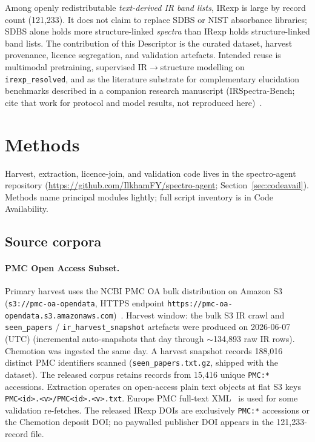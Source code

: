 \documentclass[pdflatex,sn-nature]{sn-jnl}
\begin{document}
Among openly redistributable \emph{text-derived IR band lists}, IRexp is large by
record count (121,233).
It does not claim to replace SDBS or NIST absorbance libraries; SDBS alone holds
more structure-linked \emph{spectra} than IRexp holds structure-linked band lists.
The contribution of this Descriptor is the curated dataset, harvest provenance,
licence segregation, and validation artefacts.
Intended reuse is multimodal pretraining, supervised IR$\to$structure modelling
on \texttt{irexp\_resolved}, and as the literature substrate for complementary
elucidation benchmarks described in a companion research manuscript
(IRSpectra-Bench; cite that work for protocol and model results, not
reproduced here)~\citep{yabbarov2026irspectra}.

\section{Methods}\label{sec:methods}

Harvest, extraction, licence-join, and validation code lives in the
spectro-agent repository (\url{https://github.com/IlkhamFY/spectro-agent};
Section~\ref{sec:codeavail}).
Methods name principal modules lightly; full script inventory is in Code
Availability.

\subsection{Source corpora}

\paragraph{PMC Open Access Subset.}
Primary harvest uses the NCBI PMC OA bulk distribution on Amazon S3
(\texttt{s3://pmc-oa-opendata}, HTTPS endpoint
\texttt{https://pmc-oa-opendata.s3.amazonaws.com})~\citep{pmc_oa}.
Harvest window: the bulk S3 IR crawl and \texttt{seen\_papers} /
\texttt{ir\_harvest\_snapshot} artefacts were produced on 2026-06-07 (UTC)
(incremental auto-snapshots that day through $\sim$134,893 raw IR rows).
Chemotion was ingested the same day.
A harvest snapshot records 188,016 distinct PMC identifiers scanned
(\texttt{seen\_papers.txt.gz}, shipped with the dataset).
The released corpus retains records from 15,416 unique \texttt{PMC:*} accessions.
Extraction operates on open-access plain text objects at flat S3 keys
\texttt{PMC<id>.<v>/PMC<id>.<v>.txt}.
Europe PMC full-text XML~\citep{rosonovski2024europepmc} is used for some validation re-fetches.
The released IRexp DOIs are exclusively \texttt{PMC:*} accessions or the Chemotion
deposit DOI; no paywalled publisher DOI appears in the 121,233-record file.
\end{document}
